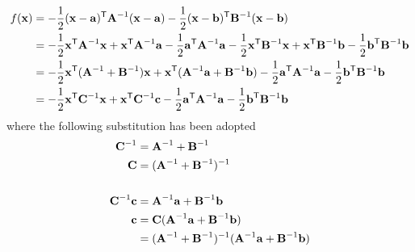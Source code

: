 \documentclass{amsmlaj}
\begin{document}
\begin{problem}
\begin{enumerate}
	\begin{equation}
		\begin{split}
			f(\vt{x})&=-\frac{1}{2}(\vt{x}-\vt{a})^\trans\vt{A}^{-1}(\vt{x}-\vt{a})
				-\frac{1}{2}(\vt{x}-\vt{b})^\trans\vt{B}^{-1}(\vt{x}-\vt{b}) \\
				&=-\frac{1}{2}\vt{x}^\trans\vt{A}^{-1}\vt{x}
				+\vt{x}^\trans\vt{A}^{-1}\vt{a}
				-\frac{1}{2}\vt{a}^\trans\vt{A}^{-1}\vt{a}
				-\frac{1}{2}\vt{x}^\trans\vt{B}^{-1}\vt{x}
				+\vt{x}^\trans\vt{B}^{-1}\vt{b}
				-\frac{1}{2}\vt{b}^\trans\vt{B}^{-1}\vt{b} \\
				&=-\frac{1}{2}\vt{x}^\trans(\vt{A}^{-1}+\vt{B}^{-1})\vt{x}
				+\vt{x}^\trans(\vt{A}^{-1}\vt{a}+\vt{B}^{-1}\vt{b})
				-\frac{1}{2}\vt{a}^\trans\vt{A}^{-1}\vt{a}
				-\frac{1}{2}\vt{b}^\trans\vt{B}^{-1}\vt{b} \\
				&=-\frac{1}{2}\vt{x}^\trans\vt{C}^{-1}\vt{x}
				+\vt{x}^\trans\vt{C}^{-1}\vt{c}
				-\frac{1}{2}\vt{a}^\trans\vt{A}^{-1}\vt{a}
				-\frac{1}{2}\vt{b}^\trans\vt{B}^{-1}\vt{b}
		\end{split}
	\end{equation}
	where the following substitution has been adopted
	\begin{equation}
		\begin{split}
						\vt{C}^{-1}&=\vt{A}^{-1}+\vt{B}^{-1} \\
						\vt{C}&=(\vt{A}^{-1}+\vt{B}^{-1})^{-1} \\
						& \\
						\vt{C}^{-1}\vt{c}&=\vt{A}^{-1}\vt{a}+\vt{B}^{-1}\vt{b} \\
						\vt{c}&=\vt{C}(\vt{A}^{-1}\vt{a}+\vt{B}^{-1}\vt{b}) \\
						&=(\vt{A}^{-1}+\vt{B}^{-1})^{-1}(\vt{A}^{-1}\vt{a}+\vt{B}^{-1}\vt{b})
		\end{split}
	\end{equation}


\end{enumerate}
\end{problem}
\end{document}
